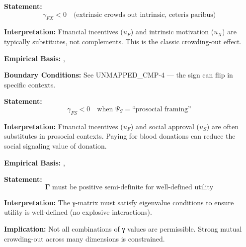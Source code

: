 \begin{tcolorbox}[colback=gray!5!white, colframe=gray!75!black,
    title=Axiom UNMAPPED_CMP-5: Crowding-Out Theorem]
\textbf{Statement:}
\begin{equation}
\gamma_{FX} < 0 \quad \text{(extrinsic crowds out intrinsic, ceteris paribus)}
\end{equation}

\textbf{Interpretation:} Financial incentives ($u_F$) and intrinsic motivation ($u_X$)
are typically substitutes, not complements. This is the classic crowding-out effect.

\textbf{Empirical Basis:} \citet{frey1997relationship}, \citet{deci1999meta}

\textbf{Boundary Conditions:} See UNMAPPED_CMP-4 --- the sign can flip in specific contexts.
\end{tcolorbox}

\begin{tcolorbox}[colback=gray!5!white, colframe=gray!75!black,
    title=Axiom UNMAPPED_CMP-6: Social-Financial Tension]
\textbf{Statement:}
\begin{equation}
\gamma_{FS} < 0 \quad \text{when } \Psi_S = \text{``prosocial framing''}
\end{equation}

\textbf{Interpretation:} Financial incentives ($u_F$) and social approval ($u_S$)
are often substitutes in prosocial contexts. Paying for blood donations can reduce
the social signaling value of donation.

\textbf{Empirical Basis:} \citet{gneezy2011pay}, \citet{ariely2009doing}
\end{tcolorbox}

\begin{tcolorbox}[colback=gray!5!white, colframe=gray!75!black,
    title=Axiom UNMAPPED_CMP-7: Positive Definiteness Requirement]
\textbf{Statement:}
\begin{equation}
\mathbf{\Gamma} \text{ must be positive semi-definite for well-defined utility}
\end{equation}

\textbf{Interpretation:} The γ-matrix must satisfy eigenvalue conditions to ensure
utility is well-defined (no explosive interactions).

\textbf{Implication:} Not all combinations of γ values are permissible.
Strong mutual crowding-out across many dimensions is constrained.
\end{tcolorbox}

